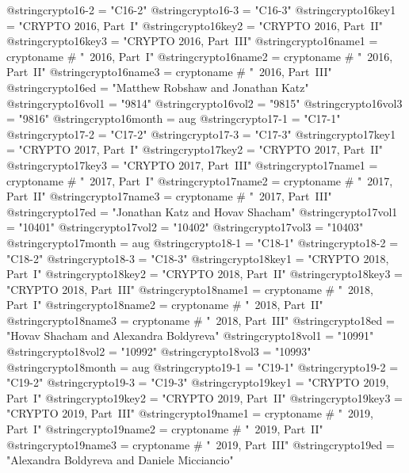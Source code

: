 @string{crypto16-2 =            "C16-2"}
@string{crypto16-3 =            "C16-3"}
@string{crypto16key1 =          "CRYPTO 2016, Part~I"}
@string{crypto16key2 =          "CRYPTO 2016, Part~II"}
@string{crypto16key3 =          "CRYPTO 2016, Part~III"}
@string{crypto16name1 =         cryptoname # "~2016, Part~I"}
@string{crypto16name2 =         cryptoname # "~2016, Part~II"}
@string{crypto16name3 =         cryptoname # "~2016, Part~III"}
@string{crypto16ed =            "Matthew Robshaw and Jonathan Katz"}
@string{crypto16vol1 =          "9814"}
@string{crypto16vol2 =          "9815"}
@string{crypto16vol3 =          "9816"}
@string{crypto16month =         aug}
@string{crypto17-1 =            "C17-1"}
@string{crypto17-2 =            "C17-2"}
@string{crypto17-3 =            "C17-3"}
@string{crypto17key1 =          "CRYPTO 2017, Part~I"}
@string{crypto17key2 =          "CRYPTO 2017, Part~II"}
@string{crypto17key3 =          "CRYPTO 2017, Part~III"}
@string{crypto17name1 =         cryptoname # "~2017, Part~I"}
@string{crypto17name2 =         cryptoname # "~2017, Part~II"}
@string{crypto17name3 =         cryptoname # "~2017, Part~III"}
@string{crypto17ed =            "Jonathan Katz and Hovav Shacham"}
@string{crypto17vol1 =          "10401"}
@string{crypto17vol2 =          "10402"}
@string{crypto17vol3 =          "10403"}
@string{crypto17month =         aug}
@string{crypto18-1 =            "C18-1"}
@string{crypto18-2 =            "C18-2"}
@string{crypto18-3 =            "C18-3"}
@string{crypto18key1 =          "CRYPTO 2018, Part~I"}
@string{crypto18key2 =          "CRYPTO 2018, Part~II"}
@string{crypto18key3 =          "CRYPTO 2018, Part~III"}
@string{crypto18name1 =         cryptoname # "~2018, Part~I"}
@string{crypto18name2 =         cryptoname # "~2018, Part~II"}
@string{crypto18name3 =         cryptoname # "~2018, Part~III"}
@string{crypto18ed =            "Hovav Shacham and Alexandra Boldyreva"}
@string{crypto18vol1 =          "10991"}
@string{crypto18vol2 =          "10992"}
@string{crypto18vol3 =          "10993"}
@string{crypto18month =         aug}
@string{crypto19-1 =            "C19-1"}
@string{crypto19-2 =            "C19-2"}
@string{crypto19-3 =            "C19-3"}
@string{crypto19key1 =          "CRYPTO 2019, Part~I"}
@string{crypto19key2 =          "CRYPTO 2019, Part~II"}
@string{crypto19key3 =          "CRYPTO 2019, Part~III"}
@string{crypto19name1 =         cryptoname # "~2019, Part~I"}
@string{crypto19name2 =         cryptoname # "~2019, Part~II"}
@string{crypto19name3 =         cryptoname # "~2019, Part~III"}
@string{crypto19ed =            "Alexandra Boldyreva and Daniele Micciancio"}
